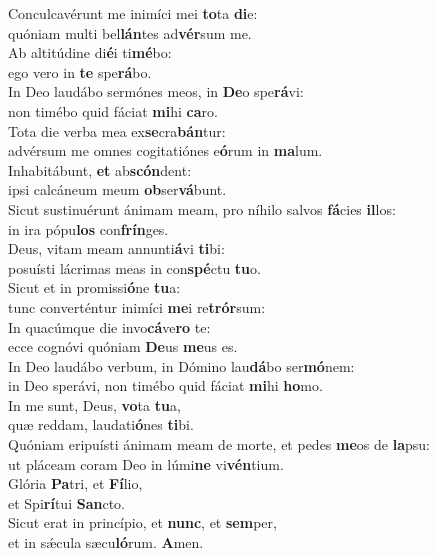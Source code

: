 \evenverse Conculcavérunt me inimíci mei \textbf{to}ta \textbf{di}e:~\*\\
\evenverse quóniam multi bel\textbf{lán}tes ad\textbf{vér}sum me.\\
\oddverse Ab altitúdine di\textbf{é}i ti\textbf{mé}bo:~\*\\
\oddverse ego vero in \textbf{te} spe\textbf{rá}bo.\\
\evenverse In Deo laudábo sermónes meos, in \textbf{De}o spe\textbf{rá}vi:~\*\\
\evenverse non timébo quid fáciat \textbf{mi}hi \textbf{ca}ro.\\
\oddverse Tota die verba mea ex\textbf{se}cra\textbf{bán}tur:~\*\\
\oddverse advérsum me omnes cogitatiónes e\textbf{ó}rum in \textbf{ma}lum.\\
\evenverse Inhabitábunt, \textbf{et} ab\textbf{scón}dent:~\*\\
\evenverse ipsi calcáneum meum \textbf{ob}ser\textbf{vá}bunt.\\
\oddverse Sicut sustinuérunt ánimam meam, pro níhilo salvos \textbf{fá}cies \textbf{il}los:~\*\\
\oddverse in ira pópu\textbf{los} con\textbf{frín}ges.\\
\evenverse Deus, vitam meam annunti\textbf{á}vi \textbf{ti}bi:~\*\\
\evenverse posuísti lácrimas meas in con\textbf{spé}ctu \textbf{tu}o.\\
\oddverse Sicut et in promissi\textbf{ó}ne \textbf{tu}a:~\*\\
\oddverse tunc converténtur inimíci \textbf{me}i re\textbf{trór}sum:\\
\evenverse In quacúmque die invo\textbf{cá}ve\textbf{ro} te:~\*\\
\evenverse ecce cognóvi quóniam \textbf{De}us \textbf{me}us es.\\
\oddverse In Deo laudábo verbum, in Dómino lau\textbf{dá}bo ser\textbf{mó}nem:~\*\\
\oddverse in Deo sperávi, non timébo quid fáciat \textbf{mi}hi \textbf{ho}mo.\\
\evenverse In me sunt, Deus, \textbf{vo}ta \textbf{tu}a,~\*\\
\evenverse quæ reddam, laudati\textbf{ó}nes \textbf{ti}bi.\\
\oddverse Quóniam eripuísti ánimam meam de morte, et pedes \textbf{me}os de \textbf{la}psu:~\*\\
\oddverse ut pláceam coram Deo in lúmi\textbf{ne} vi\textbf{vén}tium.\\
\evenverse Glória \textbf{Pa}tri, et \textbf{Fí}lio,~\*\\
\evenverse et Spi\textbf{rí}tui \textbf{San}cto.\\
\oddverse Sicut erat in princípio, et \textbf{nunc}, et \textbf{sem}per,~\*\\
\oddverse et in sǽcula sæcu\textbf{ló}rum. \textbf{A}men.\\
